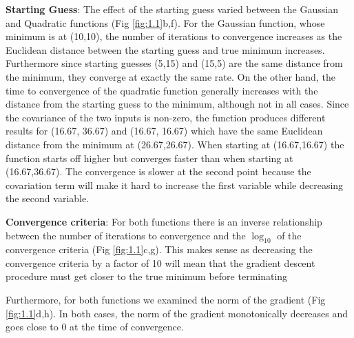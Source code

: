 \documentclass[10pt, twocolumn]{article}
\begin{document}
  \textbf{Starting Guess}: The effect of the starting guess varied between the Gaussian and Quadratic functions (Fig \ref{fig:1.1}b,f). For the Gaussian function, whose minimum is at (10,10), the number of iterations to convergence increases as the Euclidean distance between the starting guess and true minimum increases. Furthermore since starting guesses (5,15) and (15,5) are the same distance from the minimum, they converge at exactly the same rate. On the other hand, the time to convergence of the quadratic function generally increases with the distance from the starting guess to the minimum, although not in all cases. Since the covariance of the two inputs is non-zero, the function produces different results for (16.67, 36.67) and (16.67, 16.67) which have the same Euclidean distance from the minimum at (26.67,26.67). When starting at (16.67,16.67) the function starts off higher but converges faster than when starting at (16.67,36.67). The convergence is slower at the second point because the covariation term will make it hard to increase the first variable while decreasing the second variable. 
  
\textbf{Convergence criteria}: For both functions there is an inverse relationship between the number of iterations to convergence and the $\log_{10}$ of the convergence criteria (Fig \ref{fig:1.1}c,g). This makes sense as decreasing the convergence criteria by a factor of 10 will mean that the gradient descent procedure must get closer to the true minimum before terminating

\medskip
Furthermore, for both functions we examined the norm of the gradient (Fig \ref{fig:1.1}d,h). In both cases, the norm of the gradient monotonically decreases and goes close to 0 at the time of convergence.
\end{document}
